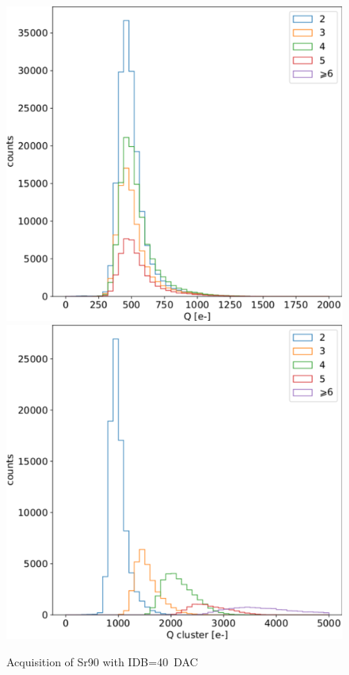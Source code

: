        \begin{figure}[h!]
            \centering                    
            \includegraphics[width=.49\linewidth]{figures/charaterization/Sr90_spectrum_per_pixel.pdf}
            \includegraphics[width=.49\linewidth]{figures/charaterization/Sr90_spectrum_cluster.pdf}
            \caption{Acquisition of Sr90 with IDB=\SI{40}{DAC}}
            \label{fig:spectrum_Sr90}
        \end{figure}     

